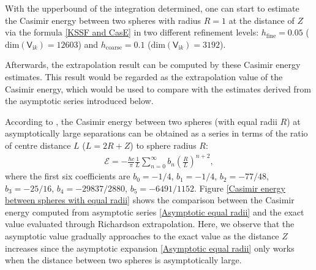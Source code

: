 With the upperbound of the integration determined, one can start to estimate the Casimir energy between two spheres with radius $R = 1$ at the 
distance of $Z$ via the formula \eqref{KSSF and CasE} in two different refinement levels: $h_{\text{fine}} = 0.05$ 
($\text{dim}(\mathsf{V}_{\mathrm{i}k}) = 12603$) and $h_{\text{coarse}} = 0.1$ ($\text{dim}(\mathsf{V}_{\mathrm{i}k}) = 3192$).

Afterwards, the extrapolation result can be computed by these Casimir energy estimates. This result would be regarded as the extrapolation value of the Casimir energy, which would be used to compare with the 
estimates derived from the asymptotic series introduced below. 

According to \cite{emig2008casimir}, the Casimir energy between two spheres (with equal radii $R$) at asymptotically 
large separations can be obtained as a series in terms of the ratio of centre distance $L$ ($L = 2R + Z$) to sphere radius $R$:
\begin{align}\label{Asymptotic equal radii}
   \mathcal{E} = -\frac{\hbar c}{\pi}\frac{1}{L}\sum_{n=0}^{\infty}b_{n}\left(\frac{R}{L}\right)^{n+2},
\end{align}
where the first six coefficients are 
$b_{0} = -1/4$, $b_{1} = -1/4$,  $b_{2} = -77/48$,  $b_{3} = -25/16$,  $b_{4} = -29837/2880$, $b_{5} = -6491/1152$. Figure 
\ref{Casimir energy between spheres with equal radii} shows the comparison between the Casimir energy computed from asymptotic series 
\eqref{Asymptotic equal radii} and the exact value evaluated through {Richardson extrapolation}. Here, we observe that the asymptotic value gradually 
approaches to the exact value as the distance $Z$ increases since the asymptotic expansion \eqref{Asymptotic equal radii} only works when the distance 
between two spheres is asymptotically large.

